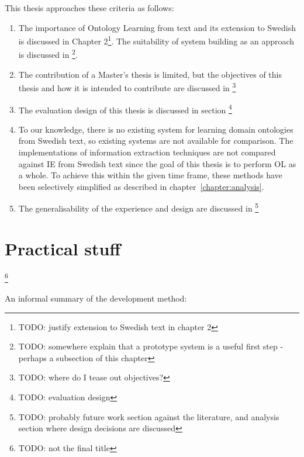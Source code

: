 \documentclass[a4paper]{report}
\newcommand{\todo}[1]{\footnote{{\color{red} TODO: #1}}}
\begin{document}
This thesis approaches these criteria as follows:
\begin{enumerate}
\item The importance of Ontology Learning from text and its extension to Swedish is discussed in Chapter 2\todo{justify extension to Swedish text in chapter 2}.
The suitability of system building as an approach is discussed in \todo{somewhere explain that a prototype system is a useful first step - perhaps a subsection of this chapter}.
\item The contribution of a Master's thesis is limited, but the objectives of this thesis and how it is intended to contribute are discussed in \todo{where do I tease out objectives?}
\item The evaluation design of this thesis is discussed in section \todo{evaluation design}
\item To our knowledge, there is no existing system for learning domain ontologies from Swedish text, so existing systems are not available for comparison.
The implementations of information extraction techniques are not compared against IE from Swedish text since the goal of this thesis is to perform OL as a whole.
To achieve this within the given time frame, these methods have been selectively simplified as described in chapter~\ref{chapter:analysis}.
\item The generalisability of the experience and design are discussed in \todo{probably future work section against the literature, and analysis section where design decisions are discussed}
\end{enumerate}

\section{Practical stuff}
\todo{not the final title}

An informal summary of the development method:
\end{document}
